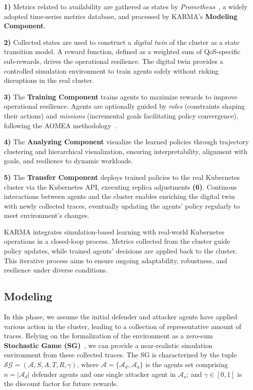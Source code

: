 \documentclass[conference]{IEEEtran}
\begin{document}
\textbf{1)} Metrics related to availability are gathered as states by \textit{Prometheus}~\cite{prometheus}, a widely adopted time-series metrics database, and processed by KARMA's \textbf{Modeling Component}.

\textbf{2)} Collected states are used to construct a \textit{digital twin} of the cluster as a state transition model. A reward function, defined as a weighted sum of QoS-specific sub-rewards, drives the operational resilience. The digital twin provides a controlled simulation environment to train agents safely without risking disruptions in the real cluster.

\textbf{3)} The \textbf{Training Component} trains agents to maximize rewards to improve operational resilience. Agents are optionally guided by \textit{roles} (constraints shaping their actions) and \textit{missions} (incremental goals facilitating policy convergence), following the AOMEA methodology~\cite{soule2024aomea}.

\textbf{4)} The \textbf{Analyzing Component} visualize the learned policies through trajectory clustering and hierarchical visualization, ensuring interpretability, alignment with goals, and resilience to dynamic workloads.

\textbf{5)} The \textbf{Transfer Component} deploys trained policies to the real Kubernetes cluster via the Kubernetes API, executing replica adjustments \textbf{(6)}. Continous interactions between agents and the cluster enables enriching the digital twin with newly collected traces, eventually updating the agents' policy regularly to meet environment's changes.

KARMA integrates simulation-based learning with real-world Kubernetes operations in a closed-loop process. Metrics collected from the cluster guide policy updates, while trained agents' decisions are applied back to the cluster. This iterative process aims to ensure ongoing adaptability, robustness, and resilience under diverse conditions.


\subsection{Modeling}

In this phase, we assume the initial defender and attacker agents have applied various action in the cluster, leading to a collection of representative amount of traces. Relying on the formalization of the environment as a zero-sum \textbf{Stochastic Game (SG)}~\cite{shapley1953stochastic}, we can provide a near-realistic simulation environment from these collected traces. The SG is characterized by the tuple $\mathcal{SG} = (\mathcal{A}, S, A, T, R, \gamma)$, where $\mathcal{A} = \{\mathcal{A}_d, \mathcal{A}_a\}$ is the agents set comprising $n = |\mathcal{A}_d|$ defender agents and one single attacker agent in $\mathcal{A}_a$; and $\gamma \in [0, 1]$ is the discount factor for future rewards.
\end{document}
